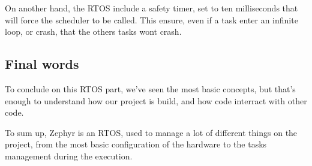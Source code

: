 On another hand, the RTOS include a safety timer, set to ten milliseconds that will force the
scheduler to be called. This ensure, even if a task enter an infinite loop, or crash, that
the others tasks wont crash.

\subsection{Final words}
To conclude on this RTOS part, we've seen the most basic concepts, but that's enough to
understand how our project is build, and how code interract with other code.

To sum up, Zephyr is an RTOS, used to manage a lot of different things on the project,
from the most basic configuration of the hardware to the tasks management during the
execution.
